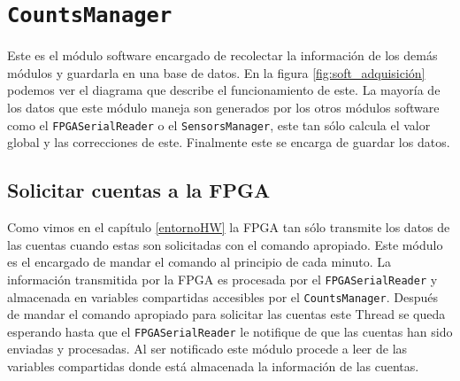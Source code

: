 \section{\texttt{CountsManager}}
	Este es el módulo software encargado de recolectar la información de los demás módulos y guardarla en una base de datos. En la figura
	\ref{fig:soft_adquisición} podemos ver el diagrama que describe el funcionamiento de este. La mayoría de los datos que este módulo maneja son
	generados por los otros módulos software como el \texttt{FPGASerialReader} o el \texttt{SensorsManager}, este tan sólo calcula el valor global
	y las correcciones de este. Finalmente este se encarga de guardar los datos. 
	\subsection{Solicitar cuentas a la FPGA}
		Como vimos en el capítulo \ref{entornoHW} la FPGA tan sólo transmite los datos de las cuentas cuando estas son solicitadas con el
		comando apropiado. Este módulo es el encargado de mandar el comando al principio de cada minuto. La información transmitida por la
		FPGA es procesada por el \texttt{FPGASerialReader} y almacenada en variables compartidas accesibles por el \texttt{CountsManager}.
		Después de mandar el comando apropiado para solicitar las cuentas este Thread se queda esperando hasta que el
		\texttt{FPGASerialReader} le notifique de que las cuentas han sido enviadas y procesadas. Al ser notificado este módulo procede a leer
		de las variables compartidas donde está almacenada la información de las cuentas.
